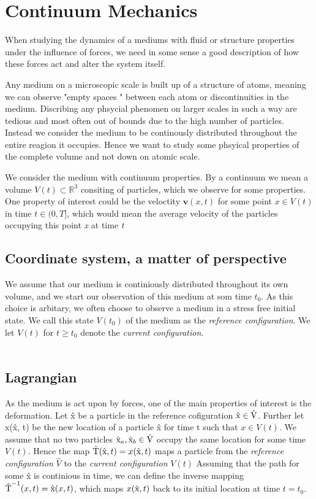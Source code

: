 \section*{Continuum Mechanics}
When studying the dynamics of a mediums with fluid or structure properties under the influence of forces, we need in some sense a good description of how these forces act and alter the system itself.

Any medium on a microscopic scale is built up of a structure of atoms, meaning we can observe "empty spaces " between each atom or discontinuities in the medium. Discribing any phsycial phenomen on larger scales in such a way are tedious and most often out of bounds due to the high number of particles. Instead we consider the medium to be continously distributed throughout the entire reagion it occupies. Hence we want to study some phsyical properties of the complete volume and not down on atomic scale. 

We consider the medium with continuum properties. By a continuum we mean a volume $V(t) \subset \mathbb{R}^3$ 
consiting of particles, which we observe for some properties. One property of interest could be the veloctity $\textbf{v}(x,t)$ for some point $x \in V(t)$ in time $t \in (0, T]$, which would mean the average velocity of the particles occupying this point \textit{x} at time \textit{t}  

\subsection*{Coordinate system, a matter of perspective}
We assume that our medium is continiously distributed throughout its own volume, and we start our observation of this medium
at som time $t_0$. As this choice is arbitary, we often choose to observe a medium in a stress free initial state. We call this state $V(t_0)$ of the medium as the \textit{reference configuration}. We let $V(t)$ for 
$t \geq t_0$ denote the \textit{current configuration}. \\ \\

\subsection*{Lagrangian}
As the medium is act upon by forces, one of the main properties of interest is the deformation. Let \^{x} be a particle in the reference cofiguration $\text{\^{x}} \in \text{\^{V}}$. 
Further let x(\^x, t) be the new location of a particle \^x for time t such that $x \in V(t)$. We assume that no two particles $\text{\^{x}}_a, \text{\^{x}}_b \in \text{\^{V}}$ occupy the same location for some time $V(t)$.
Hence the map $\text{\^{T}}(\text{\^{x}}, t) = x(\text{\^{x}}, t)$ maps a particle  from the \textit{reference configuration} $\hat{V}$ to the  \textit{current configuration} $V(t)$
Assuming that the path for some \^{x} is continious in time, we can define the inverse mapping $\text{\^{T}}^{-1}(x, t) = \text{\^{x}}(x, t)$, which maps $x(\text{\^{x}}, t)$ back to its initial location at time $t = t_0$. \\

